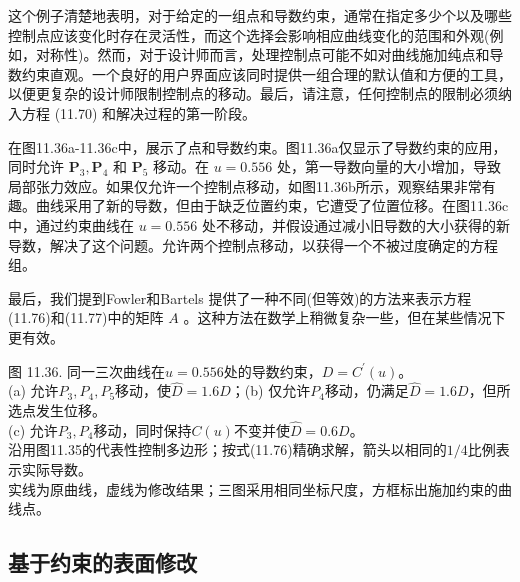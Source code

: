 \documentclass[../main.tex]{subfiles}
\begin{document}
这个例子清楚地表明，对于给定的一组点和导数约束，通常在指定多少个以及哪些控制点应该变化时存在灵活性，而这个选择会影响相应曲线变化的范围和外观(例如，对称性)。然而，对于设计师而言，处理控制点可能不如对曲线施加纯点和导数约束直观。一个良好的用户界面应该同时提供一组合理的默认值和方便的工具，以便更复杂的设计师限制控制点的移动。最后，请注意，任何控制点的限制必须纳入方程 (11.70) 和解决过程的第一阶段。

在图11.36a-11.36c中，展示了点和导数约束。图11.36a仅显示了导数约束的应用，同时允许 \({\mathbf{P}}_{3},{\mathbf{P}}_{4}\) 和 \({\mathbf{P}}_{5}\) 移动。在 \(u = {0.556}\) 处，第一导数向量的大小增加，导致局部张力效应。如果仅允许一个控制点移动，如图11.36b所示，观察结果非常有趣。曲线采用了新的导数，但由于缺乏位置约束，它遭受了位置位移。在图11.36c中，通过约束曲线在 \(u = {0.556}\) 处不移动，并假设通过减小旧导数的大小获得的新导数，解决了这个问题。允许两个控制点移动，以获得一个不被过度确定的方程组。

最后，我们提到Fowler和Bartels \cite{Fowl93} 提供了一种不同(但等效)的方法来表示方程(11.76)和(11.77)中的矩阵 \(A\) 。这种方法在数学上稍微复杂一些，但在某些情况下更有效。

\begin{center}
\begin{minipage}{37cm}
\centering
{}
\par\medskip
{}
\par\smallskip
图 11.36. 同一三次曲线在$u=0.556$处的导数约束，$D=C^{\prime}(u)$。\\
(a) 允许$P_3,P_4,P_5$移动，使$\widehat D=1.6D$；(b) 仅允许$P_4$移动，仍满足$\widehat D=1.6D$，但所选点发生位移。\\
(c) 允许$P_3,P_4$移动，同时保持$C(u)$不变并使$\widehat D=0.6D$。\\
沿用图11.35的代表性控制多边形；按式(11.76)精确求解，箭头以相同的$1/4$比例表示实际导数。\\
实线为原曲线，虚线为修改结果；三图采用相同坐标尺度，方框标出施加约束的曲线点。
\end{minipage}
\end{center}









\subsection{基于约束的表面修改}
\end{document}
